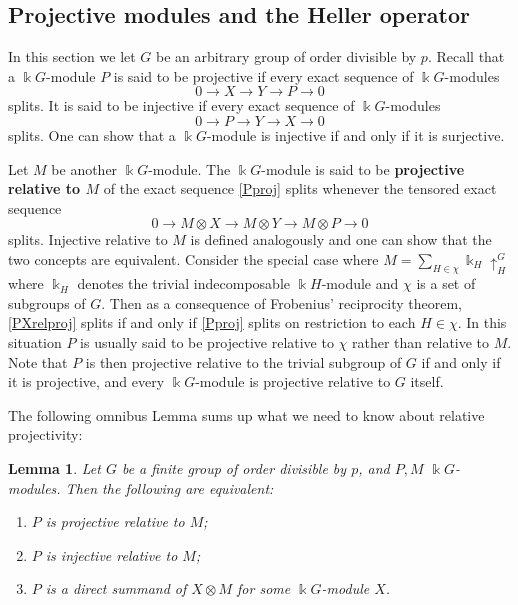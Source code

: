 \documentclass[a4paper]{amsart}
\newcommand{\kk}{\Bbbk}
\newtheorem{Lemma}{Lemma}[section]
\theoremstyle{definition}
\theoremstyle{remark}
\theoremstyle{Acknowledgments}
\begin{document}
\subsection{Projective modules and the Heller operator}

In this section we let $G$ be an arbitrary group of order divisible by $p$. Recall that a $\kk G$-module $P$ is said to be projective if every exact sequence of $\kk G$-modules
\begin{equation}\label{Pproj} 0 \longrightarrow X \longrightarrow Y \longrightarrow P \longrightarrow 0\end{equation}
splits. It is said to be injective if every exact sequence of $\kk G$-modules
\[0 \longrightarrow P \longrightarrow Y \longrightarrow X \longrightarrow 0\]
splits. One can show that a $\kk G$-module is injective if and only if it is surjective.

Let $M$ be another $\kk G$-module. The $\kk G$-module is said to be {\bf projective relative to $M$} of the exact sequence \eqref{Pproj} splits whenever the tensored exact sequence
\begin{equation}\label{PXrelproj} 0 \longrightarrow M \otimes X \longrightarrow M \otimes Y\longrightarrow M \otimes P \longrightarrow 0\end{equation}
splits. Injective relative to $M$ is defined analogously and one can show that the two concepts are equivalent. Consider the special case where $M = \sum_{H \in \chi} \kk_H \uparrow^G_H$ where $\kk_H$ denotes the trivial indecomposable $\kk H$-module and $\chi$ is a set of subgroups of $G$. Then as a consequence of Frobenius' reciprocity theorem, \eqref{PXrelproj} splits if and only if \eqref{Pproj} splits on restriction to each $H \in \chi$. In this situation $P$ is usually said to be projective relative to $\chi$ rather than relative to $M$. Note that $P$ is then projective relative to the trivial subgroup of $G$ if and only if it is projective, and every $\kk G$-module is projective relative to $G$ itself.

The following omnibus Lemma sums up what we need to know about relative projectivity:

\begin{Lemma}\label{higman}
Let $G$ be a finite group of order divisible by $p$,  and $P,M$  $\kk G$-modules. Then the following are equivalent:
\begin{enumerate}
\item[(i)] $P$ is projective relative to $M$;
\item[(ii)] $P$ is injective relative to $M$;
\item[(iii)] $P$ is a direct summand of $X \otimes M$ for some $\kk G$-module $X$.
\end{enumerate}
\end{Lemma}
 
\end{document}
